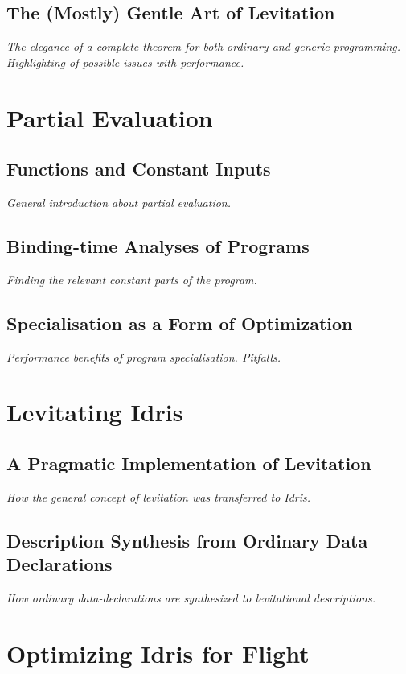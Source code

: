 \documentclass{ituthesis}
\begin{document}
\section{The (Mostly) Gentle Art of Levitation}
\label{sec:TheMostlyGentleArtofLevitation}
\textit{The elegance of a complete theorem for both ordinary and generic programming. Highlighting of possible issues with performance.}
\chapter{Partial Evaluation}
\label{cha:PartialEvaluation}
\section{Functions and Constant Inputs}
\label{sec:FunctionsandConstantInputs}
\textit{General introduction about partial evaluation.}
\section{Binding-time Analyses of Programs}
\label{sec:Binding-timeAnalysisofPrograms}
\textit{Finding the relevant constant parts of the program.}
\section{Specialisation as a Form of Optimization}
\label{sec:SpecialisationasaFormofOptimization}
\textit{Performance benefits of program specialisation. Pitfalls.}
\chapter{Levitating Idris}
\label{cha:LevitatingIdris}
\section{A Pragmatic Implementation of Levitation}
\label{sec:APragmaticImplementationofLevitation}
\textit{How the general concept of levitation was transferred to Idris.}
\section{Description Synthesis from Ordinary Data Declarations}
\label{sec:DescriptionSynthesisFromOrdinaryDataDeclarations}
\textit{How ordinary data-declarations are synthesized to levitational descriptions.}
\chapter{Optimizing Idris for Flight}
\label{cha:OptimizingIdrisforFlight}
\end{document}

